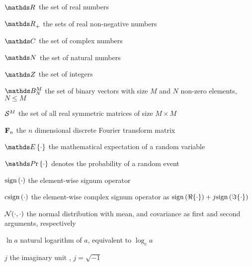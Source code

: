 \begin{list}
	\item[$\realR{}$ \hfill] the set of real numbers
	
	\item[$\realRp{}$ \hfill] the sets of real non-negative numbers
	
	\item[$\complexC{}$ \hfill] the set of complex numbers
	
	\item[$\naturalN{}$\hfill] the set of natural numbers
	
	\item[$\integerZ{}$\hfill] the set of integers
	
	\item[$\binaryB{M}_N$\hfill] the set of binary vectors with size $M$ and $N$ non-zero elements, $N \leq M$
	
	\item[$\mathcal{S}^{M}$\hfill] the set of all real symmetric matrices of size $M\times M$
	
	\item[$\mathbf{F}_n$\hfill] the $n$ dimensional discrete Fourier transform matrix
	
	\item[$\expecE{\cdot}$\hfill] the mathematical expectation of a random variable
	
	\item[$\probP{\cdot}$\hfill] denotes the probability of a random event
	
	\item[$\mathrm{sign}\left(\cdot\right)$\hfill] the element-wise signum operator
	
	\item[$\mathrm{csign}\left(\cdot\right)$\hfill] the element-wise complex signum operator as $\mathrm{sign}\left(\Re\{\cdot\}\right) + j\mathrm{sign}\left(\Im\{\cdot\}\right)$
	
	\item[$\mathcal{N}(\cdot, \cdot)$\hfill] the normal distribution with mean, and covariance as first and second arguments, respectively 
	
	\item[$\ln{a}$\hfill] natural logarithm of $a$, equivalent to $\log_e{a}$
	
	\item[$j$\hfill] the imaginary unit \ie, $j=\sqrt{-1}$

\end{list}